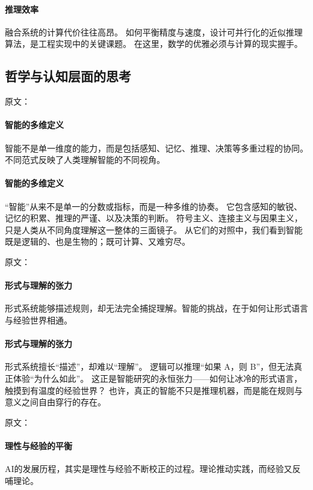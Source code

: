 \paragraph{推理效率}
融合系统的计算代价往往高昂。  
如何平衡精度与速度，设计可并行化的近似推理算法，是工程实现中的关键课题。  
在这里，数学的优雅必须与计算的现实握手。

\subsection{哲学与认知层面的思考}

原文：
\paragraph{智能的多维定义}
智能不是单一维度的能力，而是包括感知、记忆、推理、决策等多重过程的协同。不同范式反映了人类理解智能的不同视角。
\paragraph{智能的多维定义}
“智能”从来不是单一的分数或指标，而是一种多维的协奏。  
它包含感知的敏锐、记忆的积累、推理的严谨、以及决策的判断。  
符号主义、连接主义与因果主义，只是人类从不同角度理解这一整体的三面镜子。  
从它们的对照中，我们看到智能既是逻辑的、也是生物的；既可计算、又难穷尽。

原文：
\paragraph{形式与理解的张力}
形式系统能够描述规则，却无法完全捕捉理解。智能的挑战，在于如何让形式语言与经验世界相通。
\paragraph{形式与理解的张力}
形式系统擅长“描述”，却难以“理解”。  
逻辑可以推理“如果 A，则 B”，但无法真正体验“为什么如此”。  
这正是智能研究的永恒张力——如何让冰冷的形式语言，触摸到有温度的经验世界？  
也许，真正的智能不只是推理机器，而是能在规则与意义之间自由穿行的存在。

原文：
\paragraph{理性与经验的平衡}
AI的发展历程，其实是理性与经验不断校正的过程。理论推动实践，而经验又反哺理论。
